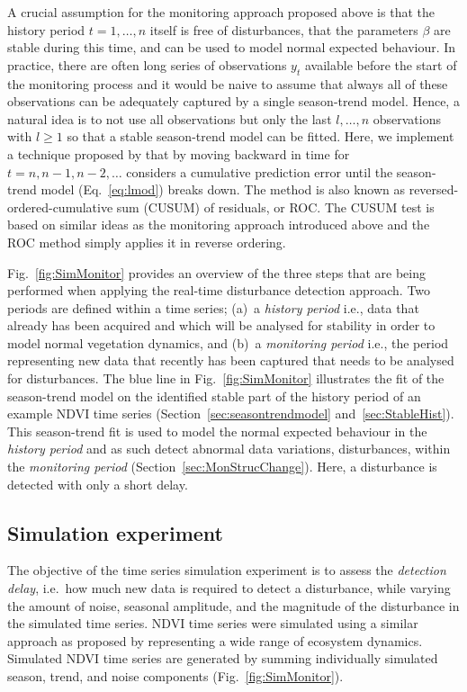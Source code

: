 \documentclass[authoryear,preprint,review,10pt]{elsarticle}
\begin{document}
A crucial assumption for the monitoring approach proposed above is that
the history period $t = 1, \dots, n$ itself is free of disturbances, that the parameters $\beta$ are stable during this time, and can be used to model normal expected behaviour. In practice, there are often long series of observations $y_t$ available
before the start of the monitoring process and it would be naive to assume
that always all of these observations can be adequately captured by a single
season-trend model. Hence, a natural idea is to not use all observations
but only the last $l, \dots, n$ observations with $l \ge 1$ so that a stable
season-trend model can be fitted. 
Here, we implement a technique proposed by \citet{Pesaran2002} that by moving backward in time for $t = n, n-1, n-2, \dots$ considers a cumulative prediction error until the season-trend model (Eq.~\ref{eq:lmod}) breaks down. The method is also known as reversed-ordered-cumulative sum (CUSUM) of residuals, or ROC.
The CUSUM test \citep[see][for more details]{Zeileis2002} is based on similar ideas as the monitoring approach introduced
above and the ROC method simply applies it in reverse ordering.

Fig.~\ref{fig:SimMonitor} provides an overview of the three steps that are being performed when applying the real-time disturbance detection approach. Two periods are defined within a time series; (a)~a \emph{history period} i.e., data that already has been acquired and which will be analysed for stability in order to model normal vegetation dynamics, and (b)~a \emph{monitoring period} i.e., the period representing new data that recently has been captured that needs to be analysed for disturbances. The blue line in Fig.~\ref{fig:SimMonitor} illustrates the fit of the season-trend model on the identified stable part of the history period of an example NDVI time series (Section~\ref{sec:seasontrendmodel} and~\ref{sec:StableHist}). This season-trend fit is used to model the normal expected behaviour in the \emph{history period} and as such detect abnormal data variations, disturbances, within the \emph{monitoring period}
(Section~\ref{sec:MonStrucChange}). Here, a disturbance is detected with only a short delay.

\subsection{Simulation experiment}\label{sec:Valsim}

The objective of the time series simulation experiment is to assess the \emph{detection delay}, i.e.\ how much new data is required to detect a disturbance,
while varying the amount of noise, seasonal amplitude, and the magnitude of the disturbance in the simulated time series. NDVI time series were simulated
using a similar approach as proposed by  \citet{Verbesselt:2010wo} representing a wide range of ecosystem dynamics. Simulated NDVI time series are generated by summing individually simulated season, trend, and noise components (Fig.~\ref{fig:SimMonitor}). 
\end{document}
